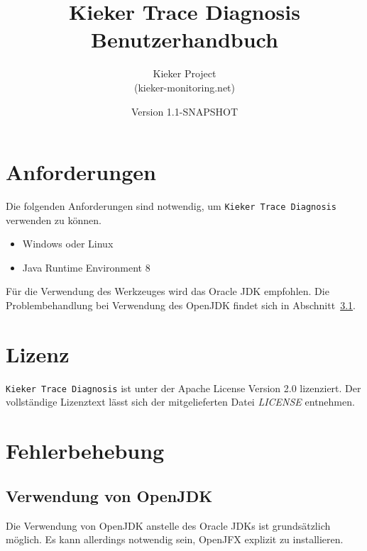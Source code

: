 \documentclass{article}
\title{Kieker Trace Diagnosis\\Benutzerhandbuch}
\date{Version 1.1-SNAPSHOT}
\author{Kieker Project\\(kieker-monitoring.net)}
\begin{document}
  \newcommand{\KiekerTraceDiagnosis}[0]{\texttt{Kieker Trace Diagnosis}}
  \newcommand{\file}[1]{\textit{#1}}

  \maketitle

  \section{Anforderungen}
  Die folgenden Anforderungen sind notwendig, um \KiekerTraceDiagnosis{} verwenden zu können.
  \begin{itemize}
    \item Windows oder Linux
    \item Java Runtime Environment 8
  \end{itemize}
  Für die Verwendung des Werkzeuges wird das Oracle JDK empfohlen. Die Problembehandlung bei Verwendung des OpenJDK findet sich in Abschnitt~\ref{OpenJDK}.

  \section{Lizenz}
  \KiekerTraceDiagnosis{} ist unter der Apache License Version 2.0 lizenziert. Der vollständige Lizenztext lässt sich der mitgelieferten Datei \file{LICENSE} entnehmen.

  \section{Fehlerbehebung}

  \subsection{Verwendung von OpenJDK}\label{OpenJDK}
  Die Verwendung von OpenJDK anstelle des Oracle JDKs ist grundsätzlich möglich. Es kann allerdings notwendig sein, OpenJFX explizit zu installieren.
\end{document}
